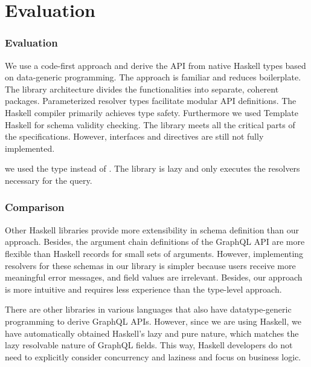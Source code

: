 \section{Evaluation}

\begin{frame}[allowframebreaks]\frametitle{Evaluation}


\begin{itemize}
   We use a code-first approach and derive the API from native Haskell types based on data-generic programming. The approach is familiar and reduces boilerplate. The library architecture divides the functionalities into separate, coherent packages. Parameterized resolver types facilitate modular API definitions.
   The Haskell compiler primarily achieves type safety. Furthermore we used Template Haskell for schema validity checking. The library meets all the critical parts of the specifications. However, interfaces and directives are still not fully implemented. 

   we used the type  instead of . The library is lazy and only executes the resolvers necessary for the query. 

\end{itemize}
\end{frame}

\begin{frame}\frametitle{Comparison}

Other Haskell libraries provide more extensibility in schema definition than our approach. Besides, the argument chain definitions of the GraphQL API are more flexible than Haskell records for small sets of arguments. However, implementing resolvers for these schemas in our library is simpler because users receive more meaningful error messages, and field values are irrelevant. Besides, our approach is more intuitive and requires less experience than the type-level approach.

There are other libraries in various languages that also have datatype-generic programming to derive GraphQL APIs. However, since we are using Haskell, we have automatically obtained Haskell's lazy and pure nature, which matches the lazy resolvable nature of GraphQL fields. This way, Haskell developers do not need to explicitly consider concurrency and laziness and focus on business logic. 

\end{frame}
